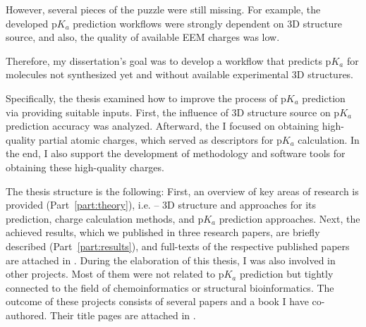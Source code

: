 However, several pieces of the puzzle were still missing. For example, the
developed p$K_a$ prediction workflows \cite{Svobodova2013} were strongly
dependent on 3D structure source, and also, the quality of available EEM charges
was low.

Therefore, my dissertation's goal was to develop a workflow that predicts p$K_a$
for mo\-le\-cu\-les not synthesized yet and without available experimental 3D
structures.

Specifically, the thesis examined how to improve the process of p$K_a$
prediction via providing suitable inputs. First, the influence of 3D structure
source on p$K_a$ prediction accuracy was analyzed. Afterward, the I focused
on obtaining high-quality partial atomic charges, which served as descriptors
for p$K_a$ calculation. In the end, I also support the development
of methodology and software tools for obtaining these high-quality charges.

The thesis structure is the following: First, an overview of key areas of research is
provided (Part~\ref{part:theory}), i.e. -- 3D structure and approaches for its prediction,
charge calculation methods, and p$K_a$ prediction approaches. Next, the
achieved results, which we published in three research papers, are brieﬂy
described (Part~\ref{part:results}), and full-texts of the respective published papers are
attached in . During the elaboration of this thesis, I was also involved
in other projects. Most of them were not related to p$K_a$ prediction but
tightly connected to the ﬁeld of chemoinformatics or structural bioinformatics.
The outcome of these projects consists of several papers and a book I have
co-authored. Their title pages are attached in .


